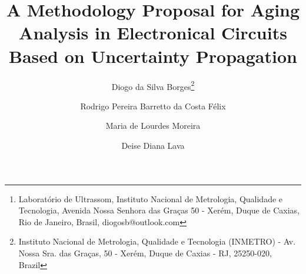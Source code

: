 \documentclass{ws-m3as}
\begin{document}
	

%
\catchline{}{}{}{}{}
%

\title{\textbf{A Methodology Proposal for Aging Analysis in Electronical Circuits Based on Uncertainty Propagation}}

\author{Diogo da Silva Borges\footnote{Instituto Nacional de Metrologia, Qualidade e Tecnologia (INMETRO) - Av. Nossa Sra. das Graças, 50 - Xerém, Duque de Caxias - RJ, 25250-020, Brazil}}

\address{\textit{LABUS, INMETRO, Av. Nossa Sra. das Graças 50 - Xerém\\ 
Rio de Janeiro, Duque de Caxias 25250-020, Brazil \footnote{Laboratório de Ultrassom, Instituto Nacional de Metrologia, Qualidade e Tecnologia, Avenida Nossa Senhora das Graças 50 - Xerém, Duque de Caxias, Rio de Janeiro, Brasil, diogosb@outlook.com}}\\ diogosb@outlook.com}

\author{Rodrigo Pereira Barretto da Costa Félix}

\address{LABUS, INMETRO, Av. Nossa Sra. das Graças 50 - Xerém\\
Rio de Janeiro, Duque de Caxias 25250-020, Brazil\\
rpfelix@inmetro.gov.br}

\author{Maria de Lourdes Moreira}

\address{SETER, IEN, Rua Hélio de Almeida 75, Cidade Universitária - Ilha do Fundão\\
	Rio de Janeiro, Rio de Janeiro 21941-972, Brazil\\
	malu@ien.gov.br}

\author{Deise Diana Lava}

\address{INMETRO, Av. Nossa Sra. das Graças 50 - Xerém\\
Rio de Janeiro, Duque de Caxias 25250-020, Brazil\\
deise\_dy@hotmail.com}

\maketitle

\begin{history}
\end{history}
\end{document}
